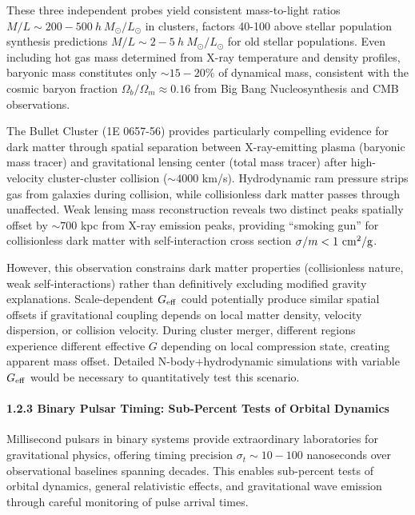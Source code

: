 \documentclass[11pt,a4paper]{article}
\begin{document}
These three independent probes yield consistent mass-to-light ratios
\(M/L \sim 200-500~h~M_\odot/L_\odot\) in clusters, factors 40-100 above
stellar population synthesis predictions
\(M/L \sim 2-5~h~M_\odot/L_\odot\) for old stellar populations. Even
including hot gas mass determined from X-ray temperature and density
profiles, baryonic mass constitutes only \(\sim 15-20\%\) of dynamical
mass, consistent with the cosmic baryon fraction
\(\Omega_b/\Omega_m \approx 0.16\) from Big Bang Nucleosynthesis and CMB
observations.

The Bullet Cluster (1E 0657-56) provides particularly compelling
evidence for dark matter through spatial separation between
X-ray-emitting plasma (baryonic mass tracer) and gravitational lensing
center (total mass tracer) after high-velocity cluster-cluster collision
(\(\sim 4000\) km/s). Hydrodynamic ram pressure strips gas from galaxies
during collision, while collisionless dark matter passes through
unaffected. Weak lensing mass reconstruction reveals two distinct peaks
spatially offset by \(\sim 700\) kpc from X-ray emission peaks,
providing ``smoking gun'' for collisionless dark matter with
self-interaction cross section \(\sigma/m < 1~{\rm cm^2/g}\).

However, this observation constrains dark matter properties
(collisionless nature, weak self-interactions) rather than definitively
excluding modified gravity explanations. Scale-dependent \(G_{\rm eff}\)
could potentially produce similar spatial offsets if gravitational
coupling depends on local matter density, velocity dispersion, or
collision velocity. During cluster merger, different regions experience
different effective \(G\) depending on local compression state, creating
apparent mass offset. Detailed N-body+hydrodynamic simulations with
variable \(G_{\rm eff}\) would be necessary to quantitatively test this
scenario.

\hypertarget{binary-pulsar-timing-sub-percent-tests-of-orbital-dynamics}{%
\paragraph{1.2.3 Binary Pulsar Timing: Sub-Percent Tests of Orbital
Dynamics}\label{binary-pulsar-timing-sub-percent-tests-of-orbital-dynamics}}

Millisecond pulsars in binary systems provide extraordinary laboratories
for gravitational physics, offering timing precision
\(\sigma_t \sim 10-100\) nanoseconds over observational baselines
spanning decades. This enables sub-percent tests of orbital dynamics,
general relativistic effects, and gravitational wave emission through
careful monitoring of pulse arrival times.
\end{document}
